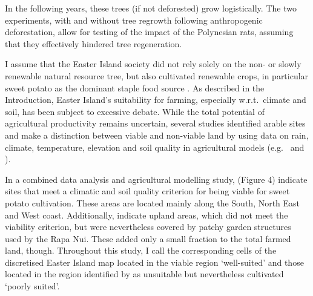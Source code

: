 In the following years, these trees (if not deforested) grow logistically.
The two experiments, with and without tree regrowth following anthropogenic deforestation, allow for testing of the impact of the Polynesian rats, assuming that they effectively hindered tree regeneration.

I assume that the Easter Island society did not rely solely on the non- or slowly renewable natural resource tree, but also cultivated renewable crops, in particular sweet potato as the dominant staple food source \citep{Louwagie2006}.
As described in the Introduction, Easter Island's suitability for farming, especially w.r.t.\ climate and soil, has been subject to excessive debate.
While the total potential of agricultural productivity remains uncertain, several studies identified arable sites and make a distinction between viable and non-viable land by using data on rain, climate, temperature, elevation and soil quality in agricultural models (e.g.\ \citet{Louwagie2006} and \citet{Puleston2017}).

In a combined data analysis and agricultural modelling study, \citet{Puleston2017} (Figure 4) indicate sites that meet a climatic and soil quality criterion for being viable for sweet potato cultivation.
These areas are located mainly along the South, North East and West coast. 
Additionally, \citet{Puleston2017} indicate upland areas, which did not meet the viability criterion, but were nevertheless covered by patchy garden structures used by the Rapa Nui.
These added only a small fraction to the total farmed land, though.
Throughout this study, I call the corresponding cells of the discretised Easter Island map located in the viable region `well-suited' and those located in the region identified by \citet{Puleston2017} as unsuitable but nevertheless cultivated `poorly suited'.

